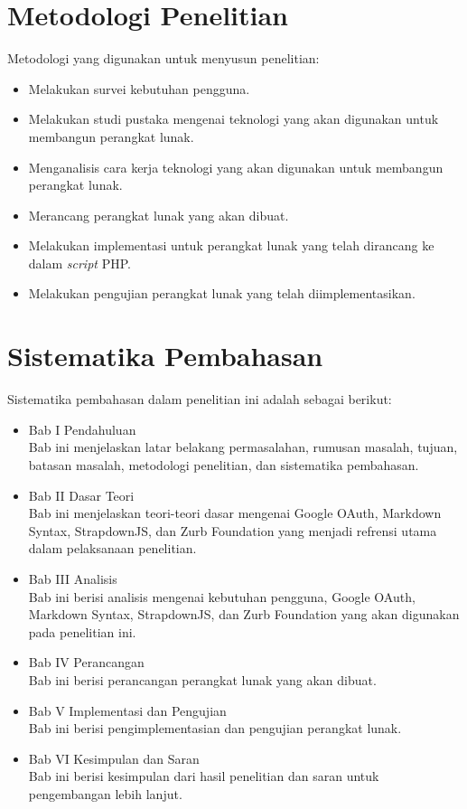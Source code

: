 \section{Metodologi Penelitian}
Metodologi yang digunakan untuk menyusun penelitian:
\begin{itemize}
    \item Melakukan survei kebutuhan pengguna.
	\item Melakukan studi pustaka mengenai teknologi yang akan digunakan untuk
	membangun perangkat lunak.
	\item Menganalisis cara kerja teknologi yang akan digunakan untuk membangun
	perangkat lunak.
	\item Merancang perangkat lunak yang akan dibuat.
	\item Melakukan implementasi untuk perangkat lunak yang
	telah dirancang ke dalam {\it script} PHP.
	\item Melakukan pengujian perangkat lunak yang telah diimplementasikan.
\end{itemize}

\section{Sistematika Pembahasan}
Sistematika pembahasan dalam penelitian ini adalah sebagai berikut:
\begin{itemize}
	\item Bab I Pendahuluan\\
	Bab ini menjelaskan latar belakang permasalahan, rumusan masalah, tujuan, batasan masalah, metodologi penelitian, dan sistematika pembahasan.
	\item Bab II Dasar Teori\\
	Bab ini menjelaskan teori-teori dasar mengenai Google OAuth, Markdown Syntax, StrapdownJS, dan Zurb Foundation yang menjadi refrensi utama dalam pelaksanaan penelitian.
	\item Bab III Analisis\\
	Bab ini berisi analisis mengenai kebutuhan pengguna, Google OAuth, Markdown Syntax, StrapdownJS, dan Zurb Foundation yang akan digunakan pada penelitian ini.
	\item Bab IV Perancangan\\
	Bab ini berisi perancangan perangkat lunak yang akan dibuat.
	\item Bab V Implementasi dan Pengujian\\
	Bab ini berisi pengimplementasian dan pengujian perangkat lunak.
	\item Bab VI Kesimpulan dan Saran\\
	Bab ini berisi kesimpulan dari hasil penelitian dan saran untuk pengembangan lebih lanjut.
\end{itemize}